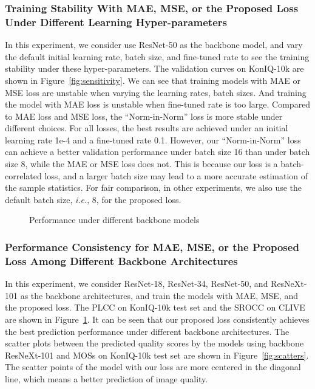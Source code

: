 \documentclass[sigconf]{acmart}
\begin{document}
\subsubsection{Training Stability With MAE, MSE, or the Proposed Loss Under Different Learning Hyper-parameters} 
In this experiment, we consider use ResNet-50 as the backbone model, and vary the default initial learning rate, batch size, and fine-tuned rate to see the training stability under these hyper-parameters.
The validation curves on KonIQ-10k are shown in Figure~\ref{fig:sensitivity}. 
We can see that training models with MAE or MSE loss are unstable when varying the learning rates, batch sizes.
And training the model with MAE loss is unstable when fine-tuned rate is too large.
Compared to MAE loss and MSE loss, the ``Norm-in-Norm'' loss is more stable under different choices.
For all losses, the best results are achieved under an initial learning rate 1e-4 and a fine-tuned rate 0.1.
However, our ``Norm-in-Norm'' loss can achieve a better validation performance under batch size 16 than under batch size 8, while the MAE or MSE loss does not.
This is because our loss is a batch-correlated loss, and a larger batch size may lead to a more accurate estimation of the sample statistics.
For fair comparison, in other experiments, we also use the default batch size, \textit{i.e.}, 8, for the proposed loss.

\begin{figure}[!htb]
    \centering
    \hfill
    \caption{Performance under different backbone models}
    \label{fig:backbone}
\end{figure}

\subsubsection{Performance Consistency for MAE, MSE, or the Proposed Loss Among Different Backbone Architectures} 
\label{sec:4.3.4}
In this experiment, we consider ResNet-18, ResNet-34, ResNet-50, and ResNeXt-101 as the backbone architectures, and train the models with MAE, MSE, and the proposed loss. 
The PLCC on KonIQ-10k test set and the SROCC on CLIVE are shown in Figure~\ref{fig:backbone}.
It can be seen that our proposed loss consistently achieves the best prediction performance under different backbone architectures.
The scatter plots between the predicted quality scores by the models using backbone ResNeXt-101 and MOSs on KonIQ-10k test set are shown in Figure~\ref{fig:scatters}.
The scatter points of the model with our loss are more centered in the diagonal line, which means a better prediction of image quality.
\end{document}
